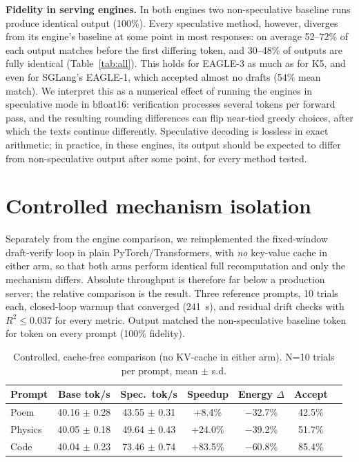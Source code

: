 \documentclass[conference]{IEEEtran}
\begin{document}
\textbf{Fidelity in serving engines.} In both engines two non-speculative
baseline runs produce identical output (100\%). Every speculative method,
however, diverges from its engine's baseline at some point in most
responses: on average 52--72\% of each output matches before the first
differing token, and 30--48\% of outputs are fully identical
(Table~\ref{tab:all}). This holds for EAGLE-3 as much as for K5, and even
for SGLang's EAGLE-1, which accepted almost no drafts (54\% mean match). We interpret
this as a numerical effect of running the engines in speculative mode in
bfloat16: verification processes several tokens per forward pass, and the
resulting rounding differences can flip near-tied greedy choices, after
which the texts continue differently. Speculative decoding is lossless in
exact arithmetic; in practice, in these engines, its output should be
expected to differ from non-speculative output after some point, for every
method tested.

\section{Controlled mechanism isolation}
\label{sec:isolation}

Separately from the engine comparison, we reimplemented the fixed-window
draft-verify loop in plain PyTorch/Transformers, with \emph{no} key-value
cache in either arm, so that both arms perform identical full recomputation
and only the mechanism differs. Absolute throughput is therefore far below
a production server; the relative comparison is the result. Three
reference prompts, 10 trials each, closed-loop warmup that converged
(241~s), and residual drift checks with $R^2 \le 0.037$ for every metric.
Output matched the non-speculative baseline token for token on every
prompt (100\% fidelity).

\begin{table}[t]
\centering
\caption{Controlled, cache-free comparison (no KV-cache in either arm).
N=10 trials per prompt, mean $\pm$ s.d.}
\label{tab:isolation}
\setlength{\tabcolsep}{3pt}
\begin{tabular}{lcccccc}
\toprule
Prompt & Base tok/s & Spec.\ tok/s & Speedup & Energy $\Delta$ & Accept \\
\midrule
Poem    & 40.16 $\pm$ 0.28 & 43.55 $\pm$ 0.31 & +8.4\%  & $-$32.7\% & 42.5\% \\
Physics & 40.05 $\pm$ 0.18 & 49.64 $\pm$ 0.43 & +24.0\% & $-$39.2\% & 51.7\% \\
Code    & 40.04 $\pm$ 0.23 & 73.46 $\pm$ 0.74 & +83.5\% & $-$60.8\% & 85.4\% \\
\bottomrule
\end{tabular}
\end{table}
\end{document}
